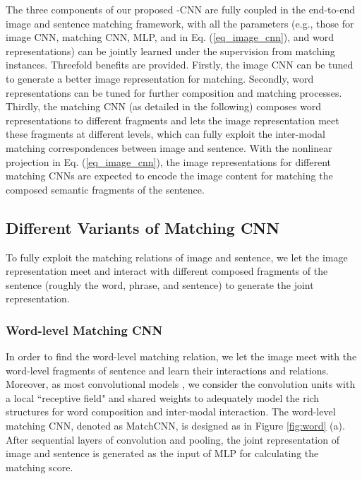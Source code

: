 \documentclass[10pt,twocolumn,letterpaper]{article}
\begin{document}
The three components of our proposed -CNN are fully coupled in the end-to-end image and sentence matching framework, with all the parameters (e.g., those for image CNN, matching CNN, MLP,  and  in Eq. (\ref{eq_image_cnn}), and word representations) can be jointly learned under the supervision from matching instances. Threefold benefits are provided. Firstly, the image CNN can be tuned to generate a better image representation for matching. Secondly, word representations can be tuned for further composition and matching processes.  Thirdly, the matching CNN (as detailed in the following) composes word representations to different fragments and lets the image representation meet these fragments at different levels, which can fully exploit the inter-modal matching correspondences between image and sentence. With the nonlinear projection in Eq. (\ref{eq_image_cnn}), the image representations  for different matching CNNs are expected to encode the image content for matching the composed semantic fragments of the sentence.



\subsection{Different Variants of Matching CNN}
\label{sec:matchingCNN}


To fully exploit the matching relations of image and sentence, we let the image representation meet and interact with different composed fragments of the sentence (roughly the word, phrase, and sentence) to generate the joint representation.


\subsubsection{Word-level Matching CNN}


In order to find the word-level matching relation, we let the image meet with the word-level fragments of sentence and learn their interactions and relations. Moreover, as most convolutional models \cite{ cnn_speech,cnn_image}, we consider the convolution units with a local ``receptive field" and shared weights to adequately model the rich structures for word composition and inter-modal interaction. The word-level matching CNN, denoted as MatchCNN, is designed as in Figure \ref{fig:word} (a). After sequential layers of convolution and pooling, the joint representation of image and sentence is generated as the input of MLP for calculating the matching score.
\end{document}
